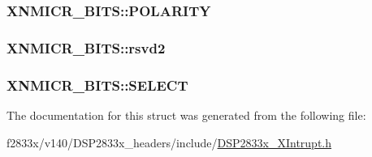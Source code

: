 \subsubsection[{P\+O\+L\+A\+R\+I\+T\+Y}]{ X\+N\+M\+I\+C\+R\+\_\+\+B\+I\+T\+S\+::\+P\+O\+L\+A\+R\+I\+T\+Y}\label{struct_x_n_m_i_c_r___b_i_t_s_af66cb1b0a221d0e29cb647874437eea8}
\hypertarget{struct_x_n_m_i_c_r___b_i_t_s_a70f36d4092d51d74d46f083122cf8dfd}{}
\subsubsection[{rsvd2}]{ X\+N\+M\+I\+C\+R\+\_\+\+B\+I\+T\+S\+::rsvd2}\label{struct_x_n_m_i_c_r___b_i_t_s_a70f36d4092d51d74d46f083122cf8dfd}
\hypertarget{struct_x_n_m_i_c_r___b_i_t_s_a1b9e9b4b98c39f2215b5e498661389fa}{}
\subsubsection[{S\+E\+L\+E\+C\+T}]{ X\+N\+M\+I\+C\+R\+\_\+\+B\+I\+T\+S\+::\+S\+E\+L\+E\+C\+T}\label{struct_x_n_m_i_c_r___b_i_t_s_a1b9e9b4b98c39f2215b5e498661389fa}


The documentation for this struct was generated from the following file\+:\begin{DoxyCompactItemize}
\item 
f2833x/v140/\+D\+S\+P2833x\+\_\+headers/include/\hyperlink{_d_s_p2833x___x_intrupt_8h}{D\+S\+P2833x\+\_\+\+X\+Intrupt.\+h}\end{DoxyCompactItemize}
